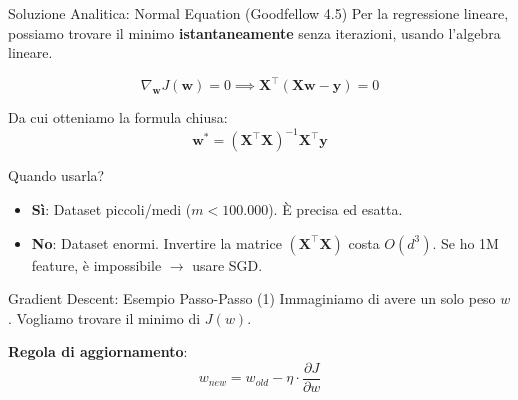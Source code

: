 \documentclass[aspectratio=169, 10pt]{beamer}
\begin{document}
\begin{frame}{Soluzione Analitica: Normal Equation (Goodfellow 4.5)}
    Per la regressione lineare, possiamo trovare il minimo \textbf{istantaneamente} senza iterazioni, usando l'algebra lineare.
    
    \[ \nabla_\mathbf{w} J(\mathbf{w}) = 0 \implies \mathbf{X}^\top (\mathbf{X}\mathbf{w} - \mathbf{y}) = 0 \]
    
    Da cui otteniamo la formula chiusa:
    \[ \mathbf{w}^* = (\mathbf{X}^\top \mathbf{X})^{-1} \mathbf{X}^\top \mathbf{y} \]
    
    \begin{block}{Quando usarla?}
        \begin{itemize}
            \item \textbf{Sì}: Dataset piccoli/medi ($m < 100.000$). È precisa ed esatta.
            \item \textbf{No}: Dataset enormi. Invertire la matrice $(\mathbf{X}^\top \mathbf{X})$ costa $O(d^3)$. Se ho 1M feature, è impossibile $\to$ usare SGD.
        \end{itemize}
    \end{block}
\end{frame}

\begin{frame}{Gradient Descent: Esempio Passo-Passo (1)}
    Immaginiamo di avere un solo peso $w$. Vogliamo trovare il minimo di $J(w)$.
    
    \textbf{Regola di aggiornamento}:
    \[ w_{new} = w_{old} - \eta \cdot \frac{\partial J}{\partial w} \]
    
    \centering
\end{frame}
\end{document}
